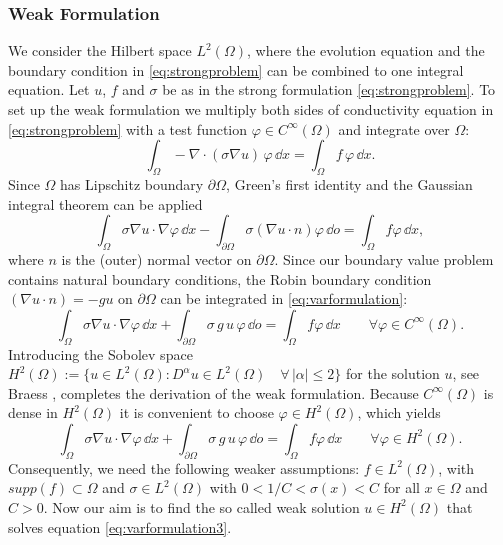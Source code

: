 \documentclass[a4paper, 11pt, twoside]{article}
\begin{document}
\subsubsection{Weak Formulation}\label{sectionWeak_formulation}
We consider the Hilbert space $L^2(\Omega)$, where the evolution equation and the boundary condition in \eqref{eq:strongproblem} can be combined to one integral equation. Let $u$, $f$ and $\sigma$ be as in the strong formulation \eqref{eq:strongproblem}. To set up the weak formulation we multiply both sides of conductivity equation in \eqref{eq:strongproblem} with a test function $\varphi\in C^\infty(\Omega)$ and integrate over $\Omega$:
%
\begin{equation*}
	\int_\Omega-\nabla\cdot(\sigma\nabla u)\,\varphi\,\dd x=\int_\Omega f\,\varphi\,\dd x.
\end{equation*}
%
Since $\Omega$ has Lipschitz boundary $\partial\Omega$, Green's first identity and the Gaussian integral theorem can be applied
%
\begin{equation}\label{eq:varformulation}
	\int_\Omega\sigma\nabla u\cdot\nabla\varphi\,\dd x-\int_{\partial\Omega}\sigma(\nabla u\cdot n)\varphi\,\dd o=\int_\Omega f\varphi\,\dd x,
\end{equation}
%
where $n$ is the (outer) normal vector on $\partial \Omega$. Since our boundary value problem contains natural boundary conditions, the Robin boundary condition $(\nabla u\cdot n)=-gu$ on $\partial\Omega$ can be integrated in \eqref{eq:varformulation}:
%
\begin{equation}\label{eq:varformulation2}
	\int_\Omega\sigma\nabla u\cdot\nabla\varphi\,\dd x+\int_{\partial\Omega}\sigma\,g\,u\,\varphi\,\dd o=\int_\Omega f\varphi\,\dd x \qquad\forall\varphi\in C^\infty(\Omega).
\end{equation}
%
Introducing the Sobolev space $H^2(\Omega):=\{u\in L^2(\Omega):D^{\alpha}u\in L^2(\Omega)\quad\forall\,|\alpha|\le 2\}$ for the solution $u$, see Braess \cite{bib:bra03}, completes the derivation of the weak formulation. Because $C^\infty(\Omega)$ is dense in $H^2(\Omega)$ it is convenient to choose $\varphi\in H^2(\Omega)$, which yields
%
\begin{equation}\label{eq:varformulation3}
	\int_\Omega\sigma\nabla u\cdot\nabla\varphi\,\dd x+\int_{\partial\Omega}\sigma\,g\,u\,\varphi\,\dd o=\int_\Omega f\varphi\,\dd x \qquad \forall \varphi\in H^2(\Omega).
\end{equation}
%
Consequently, we need the following weaker assumptions: $f\in L^2(\Omega)$, with $supp(f)\subset\Omega$ and $\sigma\in L^2(\Omega)$ with $0<1/C<\sigma(x)<C$ for all $x\in\Omega$ and $C>0$. Now our aim is to find the so called weak solution $u\in H^2(\Omega)$ that solves equation \eqref{eq:varformulation3}.\\
\end{document}
